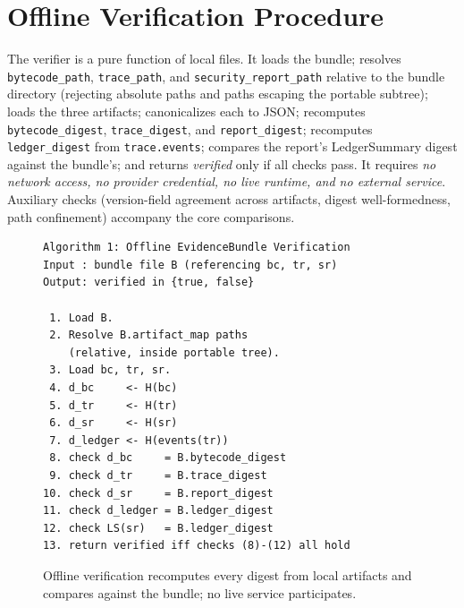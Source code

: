 \documentclass[conference]{IEEEtran}
\newcommand{\code}[1]{\texttt{\small #1}}
\begin{document}
\section{Offline Verification Procedure}\label{sec:verify}
The verifier is a pure function of local files. It loads the bundle; resolves
\code{bytecode\_path}, \code{trace\_path}, and \code{security\_report\_path} relative to
the bundle directory (rejecting absolute paths and paths escaping the portable subtree);
loads the three artifacts; canonicalizes each to JSON; recomputes \code{bytecode\_digest},
\code{trace\_digest}, and \code{report\_digest}; recomputes \code{ledger\_digest} from
\code{trace.events}; compares the report's LedgerSummary digest against the bundle's; and
returns \emph{verified} only if all checks pass. It requires \emph{no network access, no
provider credential, no live runtime, and no external service}. Auxiliary checks
(version-field agreement across artifacts, digest well-formedness, path confinement)
accompany the core comparisons.

\begin{figure}[t]
\begin{lstlisting}
Algorithm 1: Offline EvidenceBundle Verification
Input : bundle file B (referencing bc, tr, sr)
Output: verified in {true, false}

 1. Load B.
 2. Resolve B.artifact_map paths
    (relative, inside portable tree).
 3. Load bc, tr, sr.
 4. d_bc     <- H(bc)
 5. d_tr     <- H(tr)
 6. d_sr     <- H(sr)
 7. d_ledger <- H(events(tr))
 8. check d_bc     = B.bytecode_digest
 9. check d_tr     = B.trace_digest
10. check d_sr     = B.report_digest
11. check d_ledger = B.ledger_digest
12. check LS(sr)   = B.ledger_digest
13. return verified iff checks (8)-(12) all hold
\end{lstlisting}
\caption{Offline verification recomputes every digest from local artifacts and compares
against the bundle; no live service participates.}
\label{fig:algo}
\end{figure}
\end{document}
